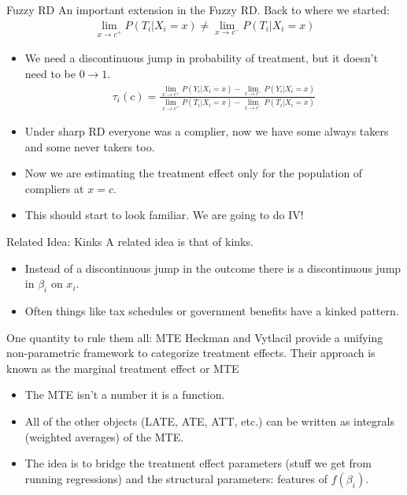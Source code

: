 \documentclass[xcolor=pdftex,dvipsnames,table,mathserif]{beamer}
\begin{document}
\begin{frame}{Fuzzy RD}
An important extension in the \alert{Fuzzy RD}.   Back to where we started:
\begin{eqnarray*}
\lim_{x\rightarrow c^{+}} P(T_i | X_i = x) \neq \lim_{x\rightarrow c^{-}}P(T_i | X_i = x)
\end{eqnarray*}
\begin{itemize}
\item We need a discontinuous jump in probability of treatment, but it doesn't need to be $0 \rightarrow 1$.
\begin{eqnarray*}
\tau_i(c) = \frac{\lim_{x\rightarrow c^{+}} P(Y_i | X_i = x) - \lim_{x\rightarrow c^{-}}P(Y_i | X_i = x)}{\lim_{x\rightarrow c^{+}} P(T_i | X_i = x) - \lim_{x\rightarrow c^{-}}P(T_i | X_i = x)}
\end{eqnarray*}
\item Under sharp RD everyone was a \alert{complier}, now we have some \alert{always takers} and some \alert{never takers} too.
\item Now we are estimating the treatment effect only for the population of compliers at $x=c$.
\item This should start to look familiar. We are going to do IV!
\end{itemize}
\end{frame}

\begin{frame}{Related Idea: Kinks}
 A related idea is that of \alert{kinks}. 
\begin{itemize}
\item Instead of a discontinuous jump in the outcome there is a discontinuous jump in $\beta_i$ on $x_i$.
\item Often things like tax schedules or government benefits have a kinked pattern.
\end{itemize}
\end{frame}

\begin{frame}{One quantity to rule them all: MTE}
Heckman and Vytlacil provide a unifying non-parametric framework to categorize treatment effects. Their approach is known as the \alert{marginal treatment effect} or MTE
\begin{itemize}
\item The MTE isn't a number it is a \alert{function}.
\item All of the other objects (LATE, ATE, ATT, etc.) can be written as integrals (weighted averages) of the MTE.
\item The idea is to bridge the treatment effect parameters (stuff we get from running regressions) and the structural parameters: features of $f(\beta_i)$.
\end{itemize}
\end{frame}
\end{document}
